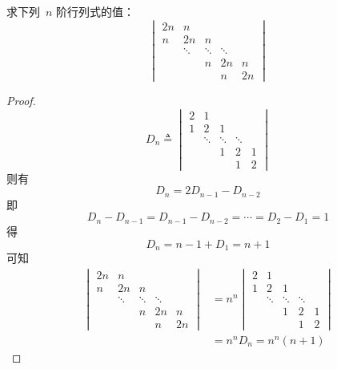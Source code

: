 \documentclass[twoside,openright]{book}
\begin{document}
\begin{CJK*}{UTF8}{}
\begin{quest}
\label{quest:103}
求下列\ $n$ 阶行列式的值：
\[
\begin{vmatrix}
2n              & n               &                 &        &                   \\
n               & 2n              & n               &        &                   \\
                & \ddots          & \ddots          & \ddots &                   \\
                &                 & n               & 2n     & n                 \\
                &                 &                 & n      & 2n
\end{vmatrix}
\]
\end{quest}
\begin{proof}
\[
D_{n} \triangleq
\begin{vmatrix}
2               & 1               &                 &        &                   \\
1               & 2               & 1               &        &                   \\
                & \ddots          & \ddots          & \ddots &                   \\
                &                 & 1               & 2      & 1                 \\
                &                 &                 & 1      & 2
\end{vmatrix}
\]
则有
\[
D_{n} = 2 D_{n-1} - D_{n-2}
\]
即
\[
D_{n} - D_{n-1} = D_{n-1} - D_{n-2} = \dotsm = D_{2} - D_{1} = 1
\]
得
\[
D_{n} = n - 1 + D_{1} = n + 1
\]
可知
\begin{align*}
\begin{vmatrix}
2n              & n               &                 &        &                   \\
n               & 2n              & n               &        &                   \\
                & \ddots          & \ddots          & \ddots &                   \\
                &                 & n               & 2n     & n                 \\
                &                 &                 & n      & 2n
\end{vmatrix}
&=n^n
\begin{vmatrix}
2               & 1               &                 &        &                   \\
1               & 2               & 1               &        &                   \\
                & \ddots          & \ddots          & \ddots &                   \\
                &                 & 1               & 2      & 1                 \\
                &                 &                 & 1      & 2
\end{vmatrix}\\
&=
n^n D_n = n^n (n + 1)
\end{align*}
\end{proof}


\end{CJK*}
\end{document}

